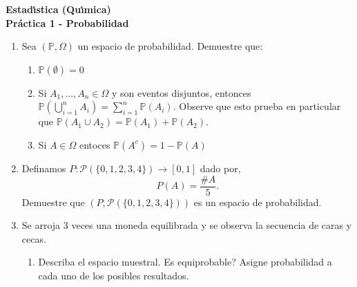\documentclass[a4paper, 11pt]{article}
\newcommand{\PP}{\mathbb{P}}
\begin{document}
\begin{center}
\textbf{\textsf{Estad\'{\i}stica (Qu\'{\i}mica) }}\\
\vspace{0.2cm}
\textbf{Pr\'{a}ctica 1 - Probabilidad\vspace{-0.1in}}
\end{center}


\begin{enumerate}

\item \label{propiedades} Sea $(\mathbb{P}, \Omega)$ un espacio de probabilidad. Demuestre que:\vspace{-0.2cm}

\begin{enumerate}
    \item $\mathbb{P}(\emptyset) = 0$
    \item \label{suma} Si $A_1, \ldots, A_n \in \Omega$ y son eventos disjuntos, entonces $\mathbb{P}\left(\bigcup_{i=1}^n A_i\right) = \sum_{i=1}^n \mathbb{P}(A_i)$. Observe que esto prueba en particular que $\mathbb{P}(A_1 \cup A_2) = \mathbb{P}(A_1) + \PP(A_2)$.
    \item Si $A \in \Omega$ entoces $\mathbb{P}(A^c) = 1-\PP(A)$
\end{enumerate}



\item Definamos $P:\mathcal{P}(\{0,1,2,3,4\})\to[0,1]$ dado por,
\begin{equation*}
    P(A) = \frac{\# A}{5}.
\end{equation*}
Demuestre que $(P,\mathcal{P}(\{0,1,2,3,4\}))$ es un espacio de probabilidad.


\item Se arroja 3 veces una moneda equilibrada y se observa la secuencia de
caras y cecas.\vspace{-0.2cm}


\begin{enumerate}
\item Describa el espacio muestral. \textquestiondown Es equiprobable? Asigne probabilidad a cada uno de los  posibles resultados.



\end{enumerate}
\end{enumerate}
\end{document}
